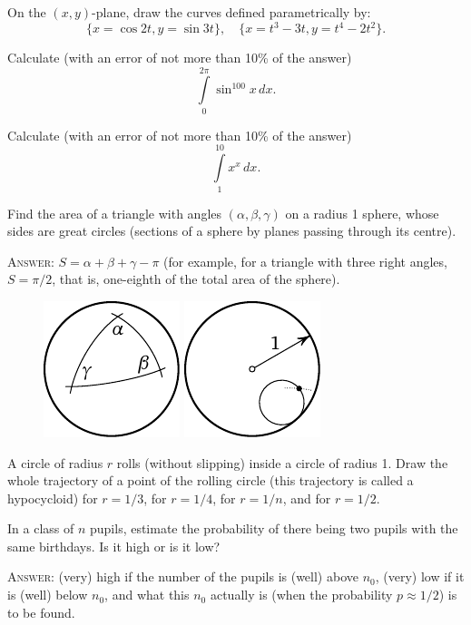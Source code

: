 \documentclass[12pt]{article}  %
\begin{document}
\bigskip
{} On the $(x,y)$-plane, draw the curves defined parametrically by: 
\[
\{x=\cos 2t, y=\sin 3t\},\quad 
\{x=t^3-3t, y=t^4-2t^2\}.
\]

\bigskip
{} Calculate (with an error of not more than 10\% of the answer)
$$
\int\limits_0^{2\pi} \sin^{100} x\,dx.
$$

\bigskip
{} Calculate (with an error of not more than 10\% of the answer)
$$
\int\limits_1^{10} x^x\,dx.
$$

\bigskip
{} Find the area of a triangle with angles $(\alpha, \beta, \gamma)$ on a radius 1 sphere,
whose sides are great circles (sections of a sphere by planes passing through its centre).

\medskip
\textsc{Answer:} $S=\alpha+\beta+\gamma-\pi$ (for example, for a triangle with 
three right angles, $S=\pi/2$, that is, one-eighth of the total area of the sphere).
\begin{figure}[h]
\centering
 \includegraphics{taskbook-44}\hskip2cm \includegraphics{taskbook-45}
\end{figure}

\bigskip
{} A circle of radius $r$ rolls (without slipping) inside a circle of radius 1.
Draw the whole trajectory of a point of the rolling circle (this trajectory is called a hypocycloid) 
for $r=1/3$, for $r=1/4$, for $r=1/n$, and for $r=1/2$.

\bigskip
{} In a class of $n$ pupils, estimate the probability of there being two pupils with the same birthdays. Is it high or is it low?

\medskip
\textsc{Answer:} (very) high if the number of the pupils is (well) above $n_0$,
(very) low if it is (well) below $n_0$, and what this $n_0$ actually is
(when the probability $p \approx 1/2$) is to be found.
\end{document}
